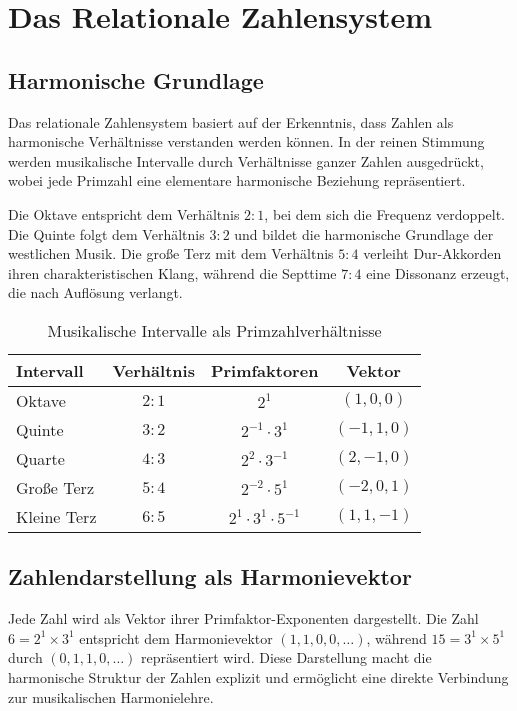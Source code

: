 \documentclass[12pt,a4paper]{report}
\begin{document}
	\section{Das Relationale Zahlensystem}
	
	\subsection{Harmonische Grundlage}
	
	Das relationale Zahlensystem basiert auf der Erkenntnis, dass Zahlen als harmonische Verh{\"a}ltnisse verstanden werden k{\"o}nnen. In der reinen Stimmung werden musikalische Intervalle durch Verh{\"a}ltnisse ganzer Zahlen ausgedr{\"u}ckt, wobei jede Primzahl eine elementare harmonische Beziehung repr{\"a}sentiert.
	
	Die Oktave entspricht dem Verh{\"a}ltnis $2:1$, bei dem sich die Frequenz verdoppelt. Die Quinte folgt dem Verh{\"a}ltnis $3:2$ und bildet die harmonische Grundlage der westlichen Musik. Die gro{\ss}e Terz mit dem Verh{\"a}ltnis $5:4$ verleiht Dur-Akkorden ihren charakteristischen Klang, w{\"a}hrend die Septtime $7:4$ eine Dissonanz erzeugt, die nach Aufl{\"o}sung verlangt.
	
	\begin{table}[h]
		\centering
		\begin{tabular}{lccc}
			\toprule
			\textbf{Intervall} & \textbf{Verh{\"a}ltnis} & \textbf{Primfaktoren} & \textbf{Vektor} \\
			\midrule
			Oktave & $2:1$ & $2^1$ & $(1, 0, 0)$ \\
			Quinte & $3:2$ & $2^{-1} \cdot 3^1$ & $(-1, 1, 0)$ \\
			Quarte & $4:3$ & $2^2 \cdot 3^{-1}$ & $(2, -1, 0)$ \\
			Gro{\ss}e Terz & $5:4$ & $2^{-2} \cdot 5^1$ & $(-2, 0, 1)$ \\
			Kleine Terz & $6:5$ & $2^1 \cdot 3^1 \cdot 5^{-1}$ & $(1, 1, -1)$ \\
			\bottomrule
		\end{tabular}
		\caption{Musikalische Intervalle als Primzahlverh{\"a}ltnisse}
	\end{table}
	
	\subsection{Zahlendarstellung als Harmonievektor}
	
	Jede Zahl wird als Vektor ihrer Primfaktor-Exponenten dargestellt. Die Zahl $6 = 2^1 \times 3^1$ entspricht dem Harmonievektor $(1, 1, 0, 0, \ldots)$, w{\"a}hrend $15 = 3^1 \times 5^1$ durch $(0, 1, 1, 0, \ldots)$ repr{\"a}sentiert wird. Diese Darstellung macht die harmonische Struktur der Zahlen explizit und erm{\"o}glicht eine direkte Verbindung zur musikalischen Harmonielehre.
	
\end{document}
